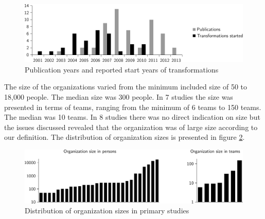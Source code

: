 \begin{figure}[b]
  \begin{center}
    \includegraphics[width=1\textwidth]{graphics/transformation_time.pdf}
    \caption{Publication years and reported start years of transformations}
    \label{fig:transformation_time}
  \end{center}
\end{figure}

The size of the organizations varied from the minimum included size of 50 to
18,000 people. The median size was 300 people. In 7 studies the size was
presented in terms of teams, ranging from the minimum of 6 teams to 150 teams.
The median was 10 teams. In 8 studies there was no direct indication on size
but the issues discussed revealed that the organization was of large size
according to our definition. The distribution of organization sizes is presented
in figure \ref{fig:organization_size}.

\begin{figure}[!t]
  \begin{center}
    \includegraphics[width=1\textwidth]{graphics/organization_size.pdf}
    \caption{Distribution of organization sizes in primary studies}
    \label{fig:organization_size}
  \end{center}
\end{figure}

